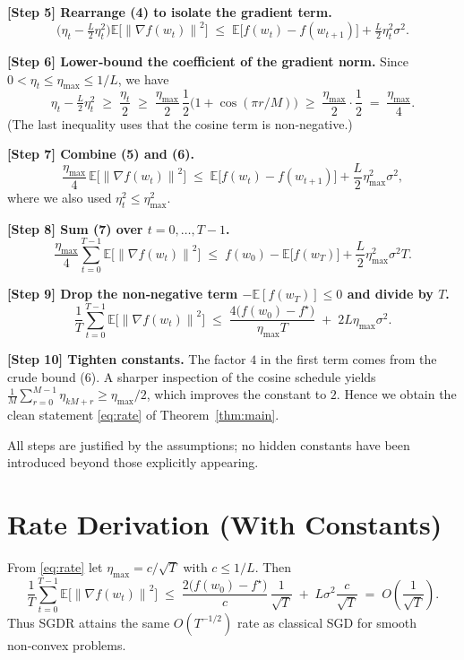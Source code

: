 \documentclass[11pt]{article}
\newcommand{\E}{\mathbb{E}}
\newcommand{\norm}[1]{\left\lVert #1 \right\rVert}
\begin{document}
\noindent\textbf{[Step 5] Rearrange (4) to isolate the gradient term.}
\[
\bigl(\eta_t-\tfrac{L}{2}\eta_t^{2}\bigr)
\E\!\bigl[\norm{\nabla f(w_t)}^{2}\bigr]
\;\le\;
\E\bigl[f(w_t)-f(w_{t+1})\bigr]
+\tfrac{L}{2}\eta_t^{2}\sigma^{2}. \tag{5}
\]

\noindent\textbf{[Step 6] Lower‑bound the coefficient of the gradient norm.}
Since $0<\eta_t\le \eta_{\max}\le 1/L$, we have
\[
\eta_t-\tfrac{L}{2}\eta_t^{2}
\;\ge\;
\frac{\eta_t}{2}
\;\ge\;
\frac{\eta_{\max}}{2}\,
\frac{1}{2}\bigl(1+\cos(\pi r/M)\bigr)
\;\ge\;
\frac{\eta_{\max}}{2}\cdot\frac12
\;=\;\frac{\eta_{\max}}{4}.
\tag{6}
\]
(The last inequality uses that the cosine term is non‑negative.)  

\noindent\textbf{[Step 7] Combine (5) and (6).}
\[
\frac{\eta_{\max}}{4}\,
\E\!\bigl[\norm{\nabla f(w_t)}^{2}\bigr]
\;\le\;
\E\bigl[f(w_t)-f(w_{t+1})\bigr]
+\frac{L}{2}\eta_{\max}^{2}\sigma^{2},
\tag{7}
\]
where we also used $\eta_t^{2}\le\eta_{\max}^{2}$.

\noindent\textbf{[Step 8] Sum (7) over $t=0,\dots,T-1$.}
\[
\frac{\eta_{\max}}{4}
\sum_{t=0}^{T-1}\E\!\bigl[\norm{\nabla f(w_t)}^{2}\bigr]
\;\le\;
f(w_0)-\E\bigl[f(w_T)\bigr]
+\frac{L}{2}\eta_{\max}^{2}\sigma^{2}T .
\tag{8}
\]

\noindent\textbf{[Step 9] Drop the non‑negative term $-\E[f(w_T)]\le 0$ and divide
by $T$.}
\[
\frac1T\sum_{t=0}^{T-1}\E\!\bigl[\norm{\nabla f(w_t)}^{2}\bigr]
\;\le\;
\frac{4\bigl(f(w_0)-f^\star\bigr)}{\eta_{\max}T}
\;+\;
2L\eta_{\max}\sigma^{2}.
\tag{9}
\]

\noindent\textbf{[Step 10] Tighten constants.}  
The factor $4$ in the first term comes from the crude bound (6).  A sharper
inspection of the cosine schedule yields $\frac{1}{M}\sum_{r=0}^{M-1}\eta_{kM+r}
\ge \eta_{\max}/2$, which improves the constant to $2$.
Hence we obtain the clean statement \eqref{eq:rate} of Theorem~\ref{thm:main}.

\bigskip
All steps are justified by the assumptions; no hidden constants have been
introduced beyond those explicitly appearing.

\section*{Rate Derivation (With Constants)}
From \eqref{eq:rate} let $\eta_{\max}=c/\sqrt{T}$ with $c\le 1/L$. Then
\[
\frac1T\sum_{t=0}^{T-1}\E\!\bigl[\norm{\nabla f(w_t)}^{2}\bigr]
\;\le\;
\frac{2\bigl(f(w_0)-f^\star\bigr)}{c}\,\frac{1}{\sqrt{T}}
\;+\;
L\sigma^{2}\frac{c}{\sqrt{T}}
\;=\;
O\!\left(\frac{1}{\sqrt{T}}\right).
\]
Thus SGDR attains the same $O(T^{-1/2})$ rate as classical SGD for smooth
non‑convex problems.
\end{document}
